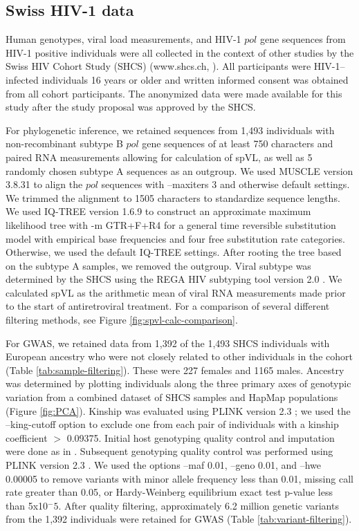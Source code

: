 \documentclass[11pt]{article}
\begin{document}
\begin{linenumbers}
\subsection*{Swiss HIV-1 data}

Human genotypes, viral load measurements, and HIV-1 $pol$ gene sequences from HIV-1 positive individuals were all collected in the context of other studies by the Swiss HIV Cohort Study (SHCS) (www.shcs.ch, \citet{Schoeni-Affolter2010, Scherrer2021CohortSHCS}). All participants were HIV-1–infected individuals 16 years or older and written informed consent was obtained from all cohort participants. The anonymized data were made available for this study after the study proposal was approved by the SHCS. 

For phylogenetic inference, we retained sequences from 1,493 individuals with non-recombinant subtype B $pol$ gene sequences of at least 750 characters and paired RNA measurements allowing for calculation of spVL, as well as 5 randomly chosen subtype A sequences as an outgroup. We used MUSCLE version 3.8.31 \citep{edgar_muscle:_2004} to align the $pol$ sequences with --maxiters 3 and otherwise default settings. We trimmed the alignment to 1505 characters to standardize sequence lengths. We used IQ-TREE version 1.6.9 \citep{Nguyen2014} to construct an approximate maximum likelihood tree with -m GTR+F+R4 for a general time reversible substitution model with empirical base frequencies and four free substitution rate categories. Otherwise, we used the default IQ-TREE settings. After rooting the tree based on the subtype A samples, we removed the outgroup. Viral subtype was determined by the SHCS using the REGA HIV subtyping tool version 2.0 \citep{DeOliveira2005}. We calculated spVL as the arithmetic mean of viral RNA measurements made prior to the start of antiretroviral treatment. For a comparison of several different filtering methods, see Figure \ref{fig:spvl-calc-comparison}. 

For GWAS, we retained data from 1,392 of the 1,493 SHCS individuals with European ancestry who were not closely related to other individuals in the cohort (Table \ref{tab:sample-filtering}). These were 227 females and 1165 males. Ancestry was determined by plotting individuals along the three primary axes of genotypic variation from a combined dataset of SHCS samples and HapMap populations (Figure \ref{fig:PCA}). Kinship was evaluated using PLINK version 2.3 \citep{Chang2015}; we used the --king-cutoff option to exclude one from each pair of individuals with a kinship coefficient $>$ 0.09375. Initial host genotyping quality control and imputation were done as in \cite{Thorball2021GeneticLymphoma}. Subsequent genotyping quality control was performed using PLINK version 2.3 \citep{Chang2015}. We used the options --maf 0.01, --geno 0.01, and --hwe 0.00005 to remove variants with minor allele frequency less than 0.01, missing call rate greater than 0.05, or Hardy-Weinberg equilibrium exact test p-value less than 5x10$^-5$. After quality filtering, approximately 6.2 million genetic variants from the 1,392 individuals were retained for GWAS (Table \ref{tab:variant-filtering}). 


\end{linenumbers}
\end{document}
